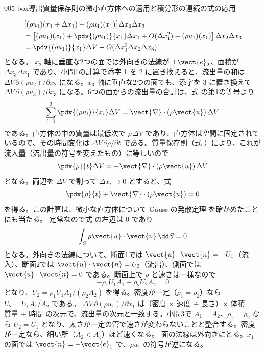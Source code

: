 \documentclass[uplatex,dvipdfmx,a4paper,11pt]{jsarticle}
\begin{document}
\begin{mondai}{005-box}{導出}{質量保存則の微小直方体への適用と積分形の連続の式の応用}
\begin{tadashii}
\begin{align*}
&\bigl[(\rho u_1)(x_1+\Delta x_1) - (\rho u_1)(x_1)\bigr]\Delta x_2\Delta x_3 \\
&= \left[(\rho u_1)(x_1) + \pdv{(\rho u_1)}{x_1}\Delta x_1 + O(\Delta x_1^{2}) - (\rho u_1)(x_1)\right]\Delta x_2\Delta x_3 \\
&= \pdv{(\rho u_1)}{x_1}\Delta V + O(\Delta x_1^{2}\Delta x_2\Delta x_3)
\end{align*}
となる。
 $x_2$ 軸に垂直な2つの面では外向きの法線が $\pm\vect{e}_2$、面積が $\Delta x_3\Delta x_1$ であり、小問1の計算で添字 1 を 2 に置き換えると、流出量の和は $\Delta V\,\partial(\rho u_2)/\partial x_2$ になる。$x_3$ 軸に垂直な2つの面でも、添字を 3 に置き換えて $\Delta V\,\partial(\rho u_3)/\partial x_3$ になる。6つの面からの流出量の合計は、式  の第1の等号より
\[ \sum_{i=1}^{3}\pdv{(\rho u_i)}{x_i}\Delta V = \vect{\nabla}\cdot(\rho\vect{u})\,\Delta V \]
である。直方体の中の質量は最低次で $\rho\,\Delta V$ であり、直方体は空間に固定されているので、その時間変化は $\Delta V\,\partial\rho/\partial t$ である。質量保存則（式 ）により、これが流入量（流出量の符号を変えたもの）に等しいので
\[ \pdv{\rho}{t}\Delta V = -\vect{\nabla}\cdot(\rho\vect{u})\,\Delta V \]
となる。両辺を $\Delta V$ で割って $\Delta x_i\to0$ とすると、式 
\[ \pdv{\rho}{t} + \vect{\nabla}\cdot(\rho\vect{u}) = 0 \]
を得る。この計算は、微小な直方体について Gauss の発散定理  を確かめたことにも当たる。
 定常なので式  の左辺は 0 であり
\[ \int_S \rho\vect{u}\cdot\vect{n}\,\dd S = 0 \]
となる。外向きの法線について、断面1では $\vect{u}\cdot\vect{n} = -U_1$（流入）、断面2では $\vect{u}\cdot\vect{n} = U_2$（流出）、側面では $\vect{u}\cdot\vect{n} = 0$ である。断面上で $\rho$ と速さは一様なので
\[ -\rho_1U_1A_1 + \rho_2U_2A_2 = 0 \]
となり、$U_2 = \rho_1U_1A_1/(\rho_2A_2)$ を得る。密度が一定（$\rho_1 = \rho_2$）なら $U_2 = U_1A_1/A_2$ である。
\kenzan $\Delta V\,\partial(\rho u_1)/\partial x_1$ は（密度 $\times$ 速度 $\div$ 長さ）$\times$ 体積 $=$ 質量 $\div$ 時間 の次元で、流出量の次元と一致する。小問3で $A_1 = A_2$、$\rho_1 = \rho_2$ なら $U_2 = U_1$ となり、太さが一定の管で速さが変わらないことと整合する。密度が一定なら、細い所（$A_2 < A_1$）ほど速くなる。
\tsumazuki 面の法線は外向きにとる。$x_1$ の面では $\vect{n} = -\vect{e}_1$ で、$\rho u_1$ の符号が逆になる。
\end{tadashii}
\end{mondai}
\end{document}

